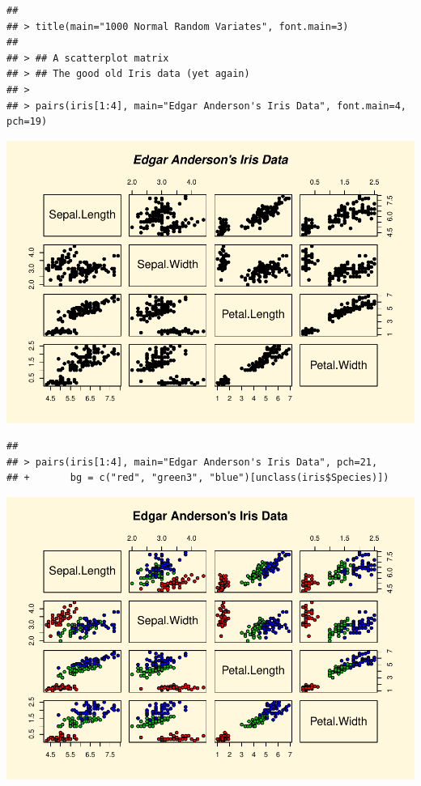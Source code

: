 \documentclass[
]{book}
\begin{document}
\begin{verbatim}
## 
## > title(main="1000 Normal Random Variates", font.main=3)
## 
## > ## A scatterplot matrix
## > ## The good old Iris data (yet again)
## > 
## > pairs(iris[1:4], main="Edgar Anderson's Iris Data", font.main=4, pch=19)
\end{verbatim}

\includegraphics{bookdown-demo_files/figure-latex/unnamed-chunk-6-8.pdf}

\begin{verbatim}
## 
## > pairs(iris[1:4], main="Edgar Anderson's Iris Data", pch=21,
## +       bg = c("red", "green3", "blue")[unclass(iris$Species)])
\end{verbatim}

\includegraphics{bookdown-demo_files/figure-latex/unnamed-chunk-6-9.pdf}
\end{document}
